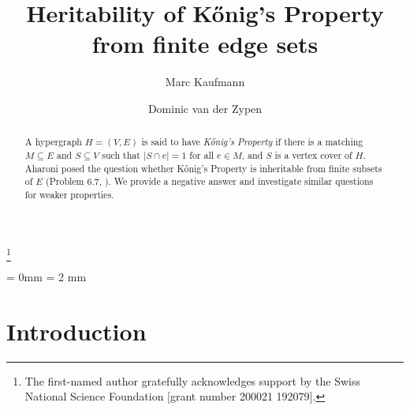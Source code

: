 \documentclass[12pt]{amsart}
\begin{document}
\title{Heritability of K\H{o}nig's Property from finite edge sets}

\author{Marc Kaufmann}
\thanks{The first-named author gratefully acknowledges support by the Swiss National Science Foundation [grant number
200021 192079].}
\address{ETH Z\"urich, CH-8092 Z\"urich,
Switzerland}

\author{Dominic van der Zypen}
\address{Bern, Switzerland}


\begin{abstract}
A hypergraph $H = (V,E)$ is said to have {\em K\H{o}nig's Property}
if there is a matching $M\subseteq E$ and $S\subseteq V$ such that 
$|S \cap e| = 1$ for all $e\in M$, and $S$ is a vertex cover of $H$.
Aharoni posed the question whether K\H{o}nig's Property is
inheritable from finite subsets of $E$ (Problem 6.7, \cite{Ah}). We
provide a negative answer and investigate similar questions
for weaker properties.
\end{abstract}
\parindent = 0mm
\parskip = 2 mm
\maketitle


\section{Introduction}
\end{document}
